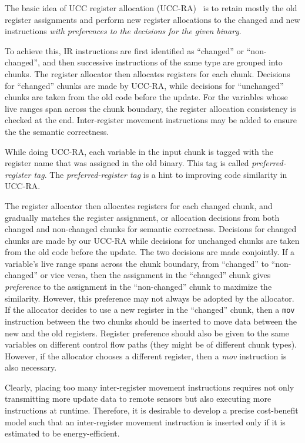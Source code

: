 The basic idea of UCC register allocation (UCC-RA)~\cite{ucc} is to retain mostly the old register assignments and perform new register allocations to the changed and new instructions {\em with preferences to the decisions for the given binary}. 

To achieve this, IR instructions are first identified as ``changed'' or ``non-changed'', and then successive instructions of the same type are grouped into chunks. The register allocator then allocates registers for each chunk.
Decisions for ``changed'' chunks are made by UCC-RA, while decisions for ``unchanged'' chunks are taken from the old code before the update. For the variables whose live ranges span across the chunk boundary, the register allocation consistency is checked at the end. Inter-register movement instructions may be added to ensure the the semantic correctness.

While doing UCC-RA, each variable in the input chunk is tagged with the register name that was assigned in the old binary. This tag is called {\em preferred-register tag}. The {\em preferred-register tag} is a hint to improving code similarity in UCC-RA.

The register allocator then allocates registers for each changed chunk, and gradually matches the register assignment, or allocation decisions from both changed and non-changed chunks for semantic correctness. Decisions for changed chunks are made by our UCC-RA while decisions for unchanged chunks are taken from the old code before the update. The two decisions are made conjointly. If a variable's live range spans across the chunk boundary, from ``changed'' to ``non-changed'' or vice versa, then the assignment in the ``changed'' chunk gives {\em preference} to the assignment in the ``non-changed'' chunk to maximize the similarity. However, this preference may not always be adopted by the allocator. If the allocator decides to use a new register in the ``changed'' chunk, then a {\tt mov} instruction between the two chunks should be inserted to move data between the new and the old registers. Register preference should also be given to the same variables on different control flow paths (they might be of different chunk types). However, if the allocator chooses a different register, then a {\it mov} instruction is also necessary.

Clearly, placing too many inter-register movement instructions requires not only transmitting more update data to remote sensors but also executing more instructions at runtime. Therefore, it is desirable to develop a precise cost-benefit model such that an inter-register movement instruction is inserted only if it is estimated to be energy-efficient.

